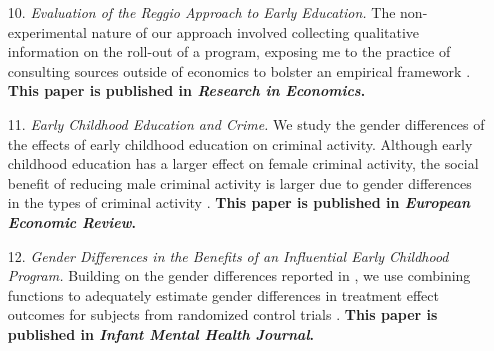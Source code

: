 \begin{enumerate}

    \item[10.] \textit{Evaluation of the Reggio Approach to Early Education.} The non-experimental nature of our approach involved collecting qualitative information on the roll-out of a program, exposing me to the practice of consulting sources outside of economics to bolster an empirical framework \citep{biroli_evaluation_2018}. \textbf{This paper is published in \textit{Research in Economics}.}

    \item[11.] \textit{Early Childhood Education and Crime.} We study the gender differences of the effects of early childhood education on criminal activity. Although early childhood education has a larger effect on female criminal activity, the social benefit of reducing male criminal activity is larger due to gender differences in the types of criminal activity \citep{garcia_gender_2018}. \textbf{This paper is published in \textit{European Economic Review}.}

    \item[12.] \textit{Gender Differences in the Benefits of an Influential Early Childhood Program.} Building on the gender differences reported in \citet{garcia_gender_2018}, we use combining functions to adequately estimate gender differences in treatment effect outcomes for subjects from randomized control trials \citep{garcia_early_2019}. \textbf{This paper is published in \textit{Infant Mental Health Journal}.}

\end{enumerate}

\singlespacing





